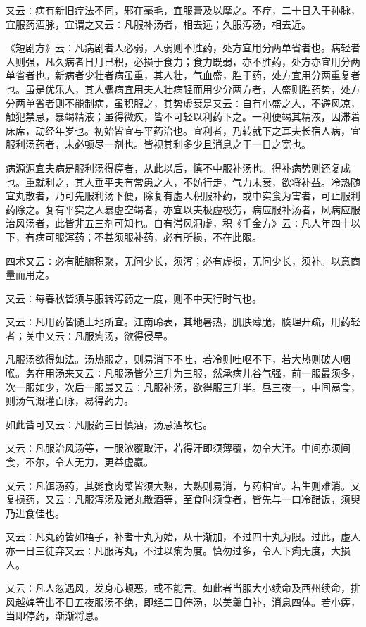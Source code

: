 \documentclass[a4paper,12pt,UTF8,twoside]{ctexbook}
\begin{document}
又云∶病有新旧疗法不同，邪在毫毛，宜服膏及以摩之。不疗，二十日入于孙脉，宜服药酒脉，宜谓之又云∶凡服补汤者，相去远；久服泻汤，相去近。

《短剧方》云∶凡病剧者人必弱，人弱则不胜药，处方宜用分两单省者也。病轻者人则强，凡久病者日月已积，必损于食力；食力既弱，亦不胜药，处方亦宜用分两单省者也。新病者少壮者病虽重，其人壮，气血盛，胜于药，处方宜用分两重复者也。虽是优乐人，其人骤病宜用夫人壮病轻而用少分两方者，人盛则胜药势，处方分两单省者则不能制病，虽积服之，其势虚衰是又云∶自有小盛之人，不避风凉，触犯禁忌，暴竭精液；虽得微疾，皆不可轻以利药下之。一利便竭其精液，因滞着床席，动经年岁也。初始皆宜与平药治也。宜利者，乃转就下之耳夫长宿人病，宜服利汤药者，未必顿尽一剂也。皆视其利多少且消息之于一日之宽也。

病源源宜夫病是服利汤得瘥者，从此以后，慎不中服补汤也。得补病势则还复成也。重就利之，其人垂平夫有常患之人，不妨行走，气力未衰，欲将补益。冷热随宜丸散者，乃可先服利汤下便，除复有虚人积服补药，或中实食为害者，可止服利药除之。复有平实之人暴虚空竭者，亦宜以夫极虚极劳，病应服补汤者，风病应服治风汤者，此皆非五三剂可知也。自有滞风洞虚，积《千金方》云∶凡人年四十以下，有病可服泻药；不甚须服补药，必有所损，不在此限。

四术又云∶必有脏腑积聚，无问少长，须泻；必有虚损，无问少长，须补。以意商量而用之。

又云∶每春秋皆须与服转泻药之一度，则不中天行时气也。

又云∶凡用药皆随土地所宜。江南岭表，其地暑热，肌肤薄脆，腠理开疏，用药轻者；关中又云∶凡服痢汤，欲得侵早。

凡服汤欲得如法。汤热服之，则易消下不吐，若冷则吐呕不下，若大热则破人咽喉。务在用汤来又云∶凡服汤皆分三升为三服，然承病儿谷气强，前一服最须多，次一服如少，次后一服最又云∶凡服补汤，欲得服三升半。昼三夜一，中间鬲食，则汤气溉灌百脉，易得药力。

如此皆可又云∶凡服药三日慎酒，汤忌酒故也。

又云∶凡服治风汤等，一服浓覆取汗，若得汗即须薄覆，勿令大汗。中间亦须间食，不尔，令人无力，更益虚羸。

又云∶凡饵汤药，其粥食肉菜皆须大熟，大熟则易消，与药相宜。若生则难消。又复损药，又云∶凡服泻汤及诸丸散酒等，至食时须食者，皆先与一口冷醋饭，须臾乃进食佳也。

又云∶凡丸药皆如梧子，补者十丸为始，从十渐加，不过四十丸为限。过此，虚人亦一日三徒弃又云∶凡服泻丸，不过以痢为度。慎勿过多，令人下痢无度，大损人。

又云∶凡人忽遇风，发身心顿恶，或不能言。如此者当服大小续命及西州续命，排风越婢等出不日五夜服汤不绝，即经二日停汤，以美羹自补，消息四体。若小瘥，当即停药，渐渐将息。
\end{document}
